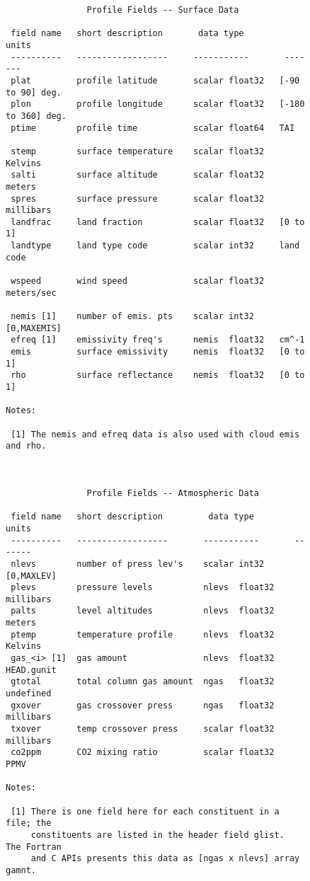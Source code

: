 \documentclass[11pt]{article}
\begin{document}
\begin{figure}
{\footnotesize
\begin{verbatim}
                Profile Fields -- Surface Data
  
 field name   short description       data type         units
 ----------   ------------------     -----------       -------
 plat         profile latitude       scalar float32   [-90 to 90] deg.
 plon         profile longitude      scalar float32   [-180 to 360] deg.
 ptime        profile time           scalar float64   TAI  

 stemp        surface temperature    scalar float32   Kelvins
 salti        surface altitude       scalar float32   meters
 spres        surface pressure       scalar float32   millibars
 landfrac     land fraction          scalar float32   [0 to 1]
 landtype     land type code         scalar int32     land code

 wspeed       wind speed             scalar float32   meters/sec

 nemis [1]    number of emis. pts    scalar int32     [0,MAXEMIS]
 efreq [1]    emissivity freq's      nemis  float32   cm^-1
 emis         surface emissivity     nemis  float32   [0 to 1]
 rho          surface reflectance    nemis  float32   [0 to 1]

Notes:

 [1] The nemis and efreq data is also used with cloud emis and rho.



                Profile Fields -- Atmospheric Data

 field name   short description         data type         units
 ----------   ------------------       -----------       -------
 nlevs        number of press lev's    scalar int32     [0,MAXLEV]
 plevs        pressure levels          nlevs  float32   millibars
 palts        level altitudes          nlevs  float32   meters
 ptemp        temperature profile      nlevs  float32   Kelvins
 gas_<i> [1]  gas amount               nlevs  float32   HEAD.gunit
 gtotal       total column gas amount  ngas   float32   undefined
 gxover       gas crossover press      ngas   float32   millibars
 txover       temp crossover press     scalar float32   millibars
 co2ppm       CO2 mixing ratio         scalar float32   PPMV

Notes:

 [1] There is one field here for each constituent in a file; the 
     constituents are listed in the header field glist.  The Fortran 
     and C APIs presents this data as [ngas x nlevs] array gamnt.

\end{verbatim}
}
\end{figure}
\end{document}
